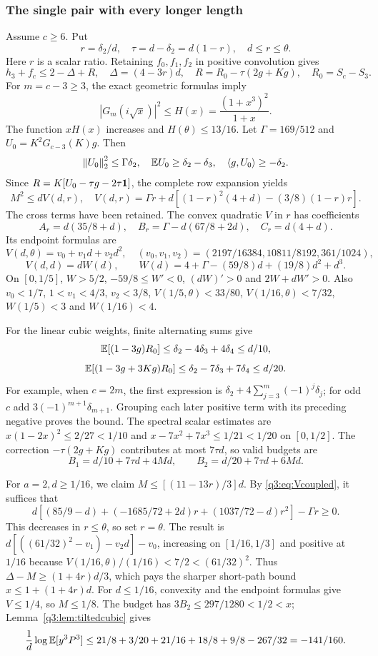 \subsubsection{The single pair with every longer length}
Assume $c\ge6$. Put
\[
 r=\delta_{2}/d,\quad \tau=d-\delta_{2}=d(1-r),\quad d\le r\le\theta .
\]
Here $r$ is a scalar ratio. Retaining $f_0,f_1,f_2$ in positive convolution gives
\[
 h_3+f_c\le2-\Delta+R,\quad
 \Delta=(4-3r)d,\quad
 R=R_0-\tau(2g+Kg),\quad R_0=S_c-S_3.
\]
For $m=c-3\ge3$, the exact geometric formulas imply
\[
 |G_m(i\sqrt x)|^2\le H(x)=\frac{(1+x^3)^2}{1+x}.
\]
The function $xH(x)$ increases and $H(\theta)\le13/16$.
Let $\Gamma=169/512$ and $U_0=K^2G_{c-3}(K)g$. Then
\[
 \left\lVert U_0\right\rVert_2^2\le\Gamma \delta_{2},\quad
 \mathbb E U_0\ge \delta_{2}-\delta_{3},\quad \left\langle g,U_0\right\rangle\ge-\delta_{2}.
\]
Since $R=K[U_0-\tau g-2\tau\mathbf1]$, the complete row expansion yields
\begin{equation}\label{q3:eq:Vcoupled}
 M^2\le dV(d,r),\quad
 V(d,r)=\Gamma r+d[(1-r)^2(4+d)-(3/8)(1-r)r].
\end{equation}
The cross terms have been retained. The convex quadratic $V$ in $r$ has coefficients
\[
 A_r=d(35/8+d),\quad B_r=\Gamma-d(67/8+2d),\quad C_r=d(4+d).
\]
Its endpoint formulas are
\[
 V(d,\theta)=v_0+v_1d+v_2d^2,\quad
 (v_0,v_1,v_2)=(2197/16384,10811/8192,361/1024),
\]
\[
 V(d,d)=dW(d),\qquad W(d)=4+\Gamma-(59/8)d+(19/8)d^2+d^3.
\]
On $[0,1/5]$, $W>5/2$, $-59/8\le W'<0$, $(dW)'>0$ and $2W+dW'>0$.
Also $v_0<1/7$, $1<v_1<4/3$, $v_2<3/8$,
$V(1/5,\theta)<33/80$, $V(1/16,\theta)<7/32$,
$W(1/5)<3$ and $W(1/16)<4$.

For the linear cubic weights, finite alternating sums give
\[
 \mathbb E[(1-3g)R_0]\le \delta_{2}-4\delta_{3}+4\delta_{4}\le d/10,
\]
\[
 \mathbb E[(1-3g+3Kg)R_0]\le \delta_{2}-7\delta_{3}+7\delta_{4}\le d/20.
\]
For example, when $c=2m$, the first expression is
$\delta_{2}+4\sum_{j=3}^m(-1)^j\delta_{j}$; for odd $c$ add $3(-1)^{m+1}\delta_{m+1}$. Grouping each later positive term with its preceding negative proves the bound. The spectral scalar estimates are $x(1-2x)^2\le2/27<1/10$ and $x-7x^2+7x^3\le1/21<1/20$ on $[0,1/2]$.
The correction $-\tau(2g+Kg)$ contributes at most $7\tau d$, so valid budgets are
\begin{equation}\label{q3:eq:singlepairbudgets}
 B_1=d/10+7\tau d+4Md,\qquad B_2=d/20+7\tau d+6Md.
\end{equation}

For $a=2,d\ge1/16$, we claim $M\le[(11-13r)/3]d$. By \eqref{q3:eq:Vcoupled}, it suffices that
\[
 d[(85/9-d)+(-1685/72+2d)r+(1037/72-d)r^2]-\Gamma r\ge0.
\]
This decreases in $r\le\theta$, so set $r=\theta$. The result is
$d[((61/32)^2-v_1)-v_2d]-v_0$, increasing on $[1/16,1/3]$ and positive at $1/16$ because $V(1/16,\theta)/(1/16)<7/2<(61/32)^2$.
Thus $\Delta-M\ge(1+4r)d/3$, which pays the sharper short-path bound $x\le1+(1+4r)d$.
For $d\le1/16$, convexity and the endpoint formulas give $V\le1/4$, so $M\le1/8$. The budget has $3B_2\le297/1280<1/2<x$; Lemma~\ref{q3:lem:tiltedcubic} gives
\[
 \frac1d\log\mathbb E[y^3P^3]\le
 21/8+3/20+21/16+18/8+9/8-267/32=-141/160.
\]

